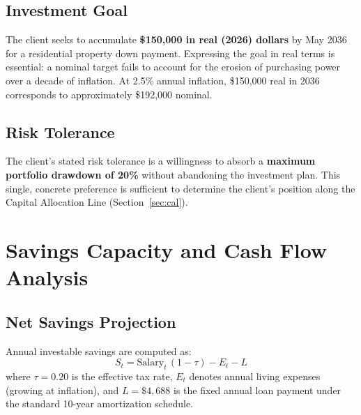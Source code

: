\documentclass[12pt, letterpaper]{article}
\begin{document}
\subsection{Investment Goal}

The client seeks to accumulate \textbf{\$150{,}000 in real (2026) dollars}
by May 2036 for a residential property down payment.
Expressing the goal in real terms is essential: a nominal target fails to account
for the erosion of purchasing power over a decade of inflation.
At 2.5\% annual inflation, \$150{,}000 real in 2036 corresponds to
approximately \$192{,}000 nominal.

\subsection{Risk Tolerance}

The client's stated risk tolerance is a willingness to absorb a
\textbf{maximum portfolio drawdown of 20\%} without abandoning the investment plan.
This single, concrete preference is sufficient to determine the client's
position along the Capital Allocation Line (Section~\ref{sec:cal}).

\section{Savings Capacity and Cash Flow Analysis}
\label{sec:savings}

\subsection{Net Savings Projection}

Annual investable savings are computed as:
\begin{equation}
  S_t = \text{Salary}_t\,(1 - \tau) - E_t - L
  \label{eq:savings}
\end{equation}
where $\tau = 0.20$ is the effective tax rate, $E_t$ denotes annual living
expenses (growing at inflation), and $L = \$4{,}688$ is the fixed annual loan
payment under the standard 10-year amortization schedule.
\end{document}
